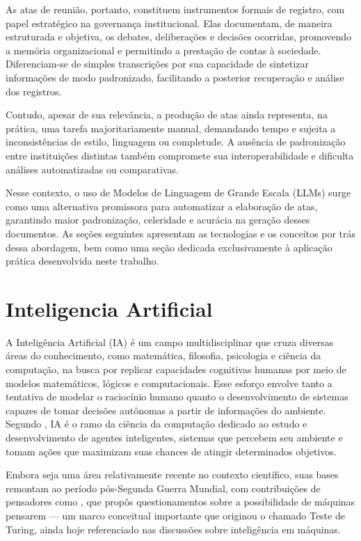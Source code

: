 As atas de reunião, portanto, constituem instrumentos formais de registro, com papel estratégico na governança institucional. Elas documentam, de maneira estruturada e objetiva, os debates, deliberações e decisões ocorridas, promovendo a memória organizacional e permitindo a prestação de contas à sociedade. Diferenciam-se de simples transcrições por sua capacidade de sintetizar informações de modo padronizado, facilitando a posterior recuperação e análise dos registros.

Contudo, apesar de sua relevância, a produção de atas ainda representa, na prática, uma tarefa majoritariamente manual, demandando tempo e sujeita a inconsistências de estilo, linguagem ou completude. A ausência de padronização entre instituições distintas também compromete sua interoperabilidade e dificulta análises automatizadas ou comparativas.

Nesse contexto, o uso de Modelos de Linguagem de Grande Escala (LLMs) surge como uma alternativa promissora para automatizar a elaboração de atas, garantindo maior padronização, celeridade e acurácia na geração desses documentos. As seções seguintes apresentam as tecnologias e os conceitos por trás dessa abordagem, bem como uma seção dedicada exclusivamente à aplicação prática desenvolvida neste trabalho.


\section{Inteligencia Artificial}
\label{sec:inteligencia-artificial}
A Inteligência Artificial (IA) é um campo multidisciplinar que cruza diversas áreas do conhecimento, como matemática, filosofia, psicologia e ciência da computação, na busca por replicar capacidades cognitivas humanas por meio de modelos matemáticos, lógicos e computacionais. Esse esforço envolve tanto a tentativa de modelar o raciocínio humano quanto o desenvolvimento de sistemas capazes de tomar decisões autônomas a partir de informações do ambiente. Segundo \cite{russell_artificial_2016}, IA é o ramo da ciência da computação dedicado ao estudo e desenvolvimento de agentes inteligentes, sistemas que percebem seu ambiente e tomam ações que maximizam suas chances de atingir determinados objetivos.

Embora seja uma área relativamente recente no contexto científico, suas bases remontam ao período pós-Segunda Guerra Mundial, com contribuições de pensadores como , que propôs questionamentos sobre a possibilidade de máquinas pensarem — um marco conceitual importante que originou o chamado Teste de Turing, ainda hoje referenciado nas discussões sobre inteligência em máquinas.

